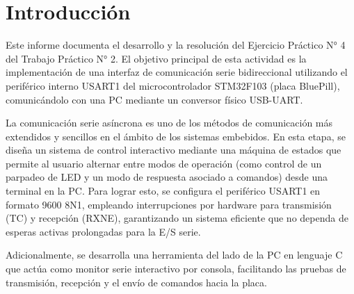 \chapter{Introducción}

Este informe documenta el desarrollo y la resolución del Ejercicio Práctico N° 4 del Trabajo Práctico N° 2.
El objetivo principal de esta actividad es la implementación de una interfaz de comunicación serie bidireccional
utilizando el periférico interno USART1 del microcontrolador STM32F103 (placa BluePill), comunicándolo con una PC
mediante un conversor físico USB-UART.

La comunicación serie asíncrona es uno de los métodos de comunicación más extendidos y sencillos en el ámbito de
los sistemas embebidos. En esta etapa, se diseña un sistema de control interactivo mediante una máquina de estados
que permite al usuario alternar entre modos de operación (como control de un parpadeo de LED y un modo de respuesta
asociado a comandos) desde una terminal en la PC. Para lograr esto, se configura el periférico USART1 en formato
9600 8N1, empleando interrupciones por hardware para transmisión (TC) y recepción (RXNE), garantizando un sistema
eficiente que no dependa de esperas activas prolongadas para la E/S serie.

Adicionalmente, se desarrolla una herramienta del lado de la PC en lenguaje C que actúa como monitor serie
interactivo por consola, facilitando las pruebas de transmisión, recepción y el envío de comandos hacia la placa.

